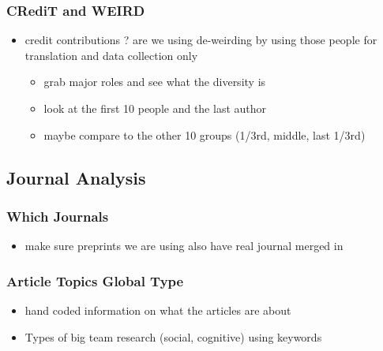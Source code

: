 \documentclass[
  english,
  man]{apa6}
\providecommand{\tightlist}{%
  \setlength{\itemsep}{0pt}\setlength{\parskip}{0pt}}
\begin{document}
\hypertarget{credit-and-weird}{%
\subsubsection{CRediT and WEIRD}\label{credit-and-weird}}

\begin{itemize}
\tightlist
\item
  credit contributions ? are we using de-weirding by using those people for translation and data collection only

  \begin{itemize}
  \tightlist
  \item
    grab major roles and see what the diversity is
  \item
    look at the first 10 people and the last author
  \item
    maybe compare to the other 10 groups (1/3rd, middle, last 1/3rd)
  \end{itemize}
\end{itemize}

\hypertarget{journal-analysis}{%
\subsection{Journal Analysis}\label{journal-analysis}}

\hypertarget{which-journals}{%
\subsubsection{Which Journals}\label{which-journals}}

\begin{itemize}
\tightlist
\item
  make sure preprints we are using also have real journal merged in
\end{itemize}

\hypertarget{article-topics-global-type}{%
\subsubsection{Article Topics Global Type}\label{article-topics-global-type}}

\begin{itemize}
\tightlist
\item
  hand coded information on what the articles are about
\item
  Types of big team research (social, cognitive) using keywords
\end{itemize}
\end{document}
